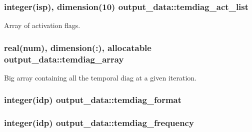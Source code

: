 \subsubsection[{\texorpdfstring{temdiag\+\_\+act\+\_\+list}{temdiag_act_list}}]{\setlength{\rightskip}{0pt plus 5cm}integer(isp), dimension(10) output\+\_\+data\+::temdiag\+\_\+act\+\_\+list}\hypertarget{namespaceoutput__data_a63d2f446c4aca8bf956973b6ff9bcfb0}{}\label{namespaceoutput__data_a63d2f446c4aca8bf956973b6ff9bcfb0}


Array of activation flags. 

\subsubsection[{\texorpdfstring{temdiag\+\_\+array}{temdiag_array}}]{\setlength{\rightskip}{0pt plus 5cm}real(num), dimension(\+:), allocatable output\+\_\+data\+::temdiag\+\_\+array}\hypertarget{namespaceoutput__data_a034b19d2c3a5211b1fd96df24cd28dd1}{}\label{namespaceoutput__data_a034b19d2c3a5211b1fd96df24cd28dd1}


Big array containing all the temporal diag at a given iteration. 

\subsubsection[{\texorpdfstring{temdiag\+\_\+format}{temdiag_format}}]{\setlength{\rightskip}{0pt plus 5cm}integer(idp) output\+\_\+data\+::temdiag\+\_\+format}\hypertarget{namespaceoutput__data_a2f4ce5fdd4011f5db5c6b9de97cf133a}{}\label{namespaceoutput__data_a2f4ce5fdd4011f5db5c6b9de97cf133a}
\subsubsection[{\texorpdfstring{temdiag\+\_\+frequency}{temdiag_frequency}}]{\setlength{\rightskip}{0pt plus 5cm}integer(idp) output\+\_\+data\+::temdiag\+\_\+frequency}\hypertarget{namespaceoutput__data_ab55f479db67f7b4af32d0a55e2ba6620}{}\label{namespaceoutput__data_ab55f479db67f7b4af32d0a55e2ba6620}
